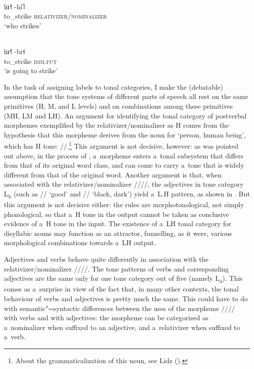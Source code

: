 \begin{exe}
	\ex
	\label{ex:whostrikes}
	\\
	\gll lɑ˧˥		-hĩ˥\\
	to\_strike		\textsc{relativizer/nominalizer}\\
	\glt ‘who strikes’
\end{exe}

\begin{exe}
	\ex
	\label{ex:goingtostrike}
	\\
	\gll lɑ˧˥		-bi˧\\
	to\_strike		\textsc{imm.fut}\\
	\glt ‘is going to strike’
\end{exe}

In the task of assigning labels to tonal categories, I make the (debatable) assumption that the tone systems of different parts of speech all rest on the same primitives (H, M, and L levels) and on combinations among these primitives (MH, LM and LH). An argument for identifying the tonal category of postverbal morphemes exemplified by the {relativizer/nominalizer} as H comes from the hypothesis that this morpheme derives from the noun
for ‘person, human being’, which has H tone: //.\footnote{About the {grammaticalization} of this noun, see Lidz (\citeyear[164, 183]{lidz2010}).} This argument is not decisive, however: as was pointed out above, in the process of , a~morpheme enters a~tonal subsystem that differs from that of its original word class, and can come to carry a~tone that is widely different from that of the original word. Another argument is that, when associated with the {relativizer/nominalizer} \mbox{////}, the adjectives in tone category L\textsubscript{b} (such as //
‘good’ and // ‘black, dark’) yield a~L.H
pattern, as shown in . But this argument is not decisive either: the rules are morphotonological, not simply phonological, so that a~H tone in the output cannot be taken as conclusive evidence of a~H tone in the input. The existence of a~LH tonal category for disyllabic nouns may function as an attractor, funnelling, as it were, various morphological combinations towards a~LH output. 

Adjectives and verbs behave quite differently in association with the {relativizer/nominalizer} \mbox{////}. The tone patterns of verbs and corresponding adjectives are the same only for one tone category out of five (namely L\textsubscript{a}). This comes as a~surprise in view of the fact that, in many other contexts, the tonal behaviour of verbs and adjectives is pretty much the same. This could have to do with semantic"=syntactic differences between the uses of the morpheme \mbox{////} with verbs and with adjectives: the morpheme can be categorized as a~{nominalizer} when suffixed to an adjective, and a~{relativizer} when suffixed to a~verb. 

